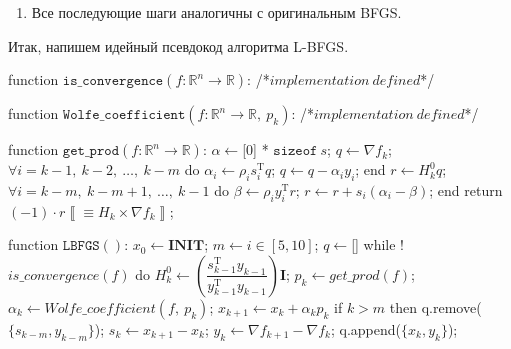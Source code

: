 \documentclass[12pt, a4paper, oneside, final]{article}
\begin{document}
\begin{enumerate}[1)]
		Из всего вышеописанного мы можем провести произведение $H_{k} \times \nabla{f_{k}}$ более эффективно следующим образом
		\begin{lstlisting}
$\alpha \gets$[0] * $\texttt{sizeof}~s$;
$q \gets \nabla{f_{k}}$;
$\forall i = k - 1, ~ k - 2, ~ \ldots, ~ k - m$ do
	$\alpha_{i} \gets \rho_{i}s_{i}^{\mathrm{T}}q$;
	$q \gets q - \alpha_{i}y_{i}$;
end
$r \gets H_{k}^{0}q$;
$\forall i = k - m, ~ k - m + 1, ~ \ldots, ~ k - 1$ do
	$\beta \gets \rho_{i}y_{i}^{\mathrm{T}}r$;
	$r \gets r + s_i(\alpha_i - \beta)$;
end
return $(-1) \cdot r \left\llbracket\equiv H_k \times \nabla{f_{k}}\right\rrbracket$;
		\end{lstlisting}
		Получение нового на данной итерации $H_{k}^{0}$ мы также сильно ускорим, лишь приблизив наши значения, используя формулу $H_{k}^{0} = \gamma_{k}\mathbf{I}$, где
		\[
			\gamma_{k} = \dfrac{s_{k - 1}^{\mathrm{T}}y_{k - 1}}{y_{k - 1}^{\mathrm{T}}y_{k - 1}}
		\]
		\item Все последующие шаги аналогичны с оригинальным BFGS.
	\end{enumerate}
	Итак, напишем идейный псевдокод алгоритма L-BFGS.
	\begin{mylisting}
function $\mathtt{is\_convergence}(f : \mathbb{R}^{n} \to \mathbb{R})$:
	/*$implementation~defined$*/

function $\mathtt{Wolfe\_coefficient}(f : \mathbb{R}^{n} \to \mathbb{R}, ~ p_{k})$:
	/*$implementation~defined$*/

function $\mathtt{get\_prod}(f : \mathbb{R}^{n} \to \mathbb{R})$:
	$\alpha \gets$[0] * $\texttt{sizeof}~s$;
	$q \gets \nabla{f_{k}}$;
	$\forall i = k - 1, ~ k - 2, ~ \ldots, ~ k - m$ do
		$\alpha_{i} \gets \rho_{i}s_{i}^{\mathrm{T}}q$;
		$q \gets q - \alpha_{i}y_{i}$;
	end
	$r \gets H_{k}^{0}q$;
	$\forall i = k - m, ~ k - m + 1, ~ \ldots, ~ k - 1$ do
		$\beta \gets \rho_{i}y_{i}^{\mathrm{T}}r$;
		$r \gets r + s_i(\alpha_i - \beta)$;
	end
	return $(-1) \cdot r \left\llbracket\equiv H_k \times \nabla{f_{k}}\right\rrbracket$;
	
function $\mathtt{LBFGS}()$:
	$x_{0} \gets \mathbf{INIT}$;
	$m \gets i \in [5, 10]$;
	$q \gets$[]
	while !$is\_convergence(f)$ do
		$H_{k}^{0} \gets \left(\dfrac{s_{k - 1}^{\mathrm{T}}y_{k - 1}}{y_{k - 1}^{\mathrm{T}}y_{k - 1}}\right)\mathbf{I}$;
		$p_{k} \gets get\_prod(f)$;
		$\alpha_{k} \gets Wolfe\_coefficient(f, ~ p_{k})$;
		$x_{k + 1} \gets x_{k} + \alpha_{k}p_{k}$
		if $k > m$ then
			q.remove($\{s_{k - m}, y_{k - m}\}$);
		$s_{k} \gets x_{k + 1} - x_{k}$;
		$y_{k} \gets \nabla{f_{k + 1}} - \nabla{f_{k}}$;
		q.append($\{x_{k}, y_{k}\}$);
	\end{mylisting}
\end{document}
